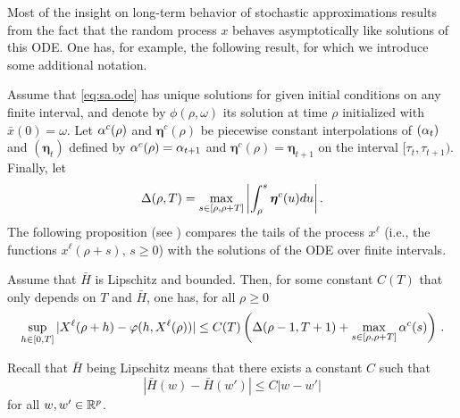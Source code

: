 Most of the insight on long-term behavior of  stochastic approximations results from the fact that the random process $x$ behaves asymptotically like solutions of this ODE. One has, for example, the following result, for which we introduce some additional notation. 

Assume that \cref{eq:sa.ode} has unique solutions for given initial conditions on any finite interval, and denote by $\phi(\rho, \omega)$ its solution at time $\rho$ initialized with $\bar x(0) = \omega$. Let $\alpha^c(\rho)$ and $\boldsymbol\eta^c(\rho)$ be piecewise constant interpolations of $(\alpha_t)$ and $(\boldsymbol\eta_t)$ defined by $\alpha^c(\rho) = \alpha_{t+1}$ and $\boldsymbol\eta^c(\rho) = \boldsymbol\eta_{t+1}$ on the interval $[\tau_{t}, \tau_{t+1})$. Finally, let 
\[
\Delta(\rho, T) = \max_{s\in [\rho, \rho+T]} \left| \int_\rho^s \bm\eta^c(u) du\right|.
\]
The following proposition (see \cite{benaim1999dynamics}) compares the tails of the process $x^\ell$  (i.e., the functions $x^\ell(\rho+s)$, $s\geq 0$) with the solutions of the ODE over finite intervals. 
\begin{proposition}[Benaim]
\label{prop:sgd.ode}
Assume that $\bar H$ is Lipschitz and bounded. Then, for some constant $C(T)$ that only depends on $T$ and $\bar H$, one has, for all $\rho\geq 0$
\begin{equation}
\label{eq:ode.2}
\sup_{h\in [0,T]} |X^\ell(\rho+h) - \varphi(h, X^\ell(\rho))| \leq C(T) \left( \Delta(\rho-1, T+1) + \max_{s\in[\rho, \rho+T]} \alpha^c(s)\right)\,.
\end{equation}
\end{proposition}
Recall that $\bar H$ being Lipschitz means that there exists a constant $C$ such that
\[
|\bar H (w) - \bar H(w') |\leq C |w-w'|
\]
for all $w, w' \in {\mathbb{R}}^p$. 

